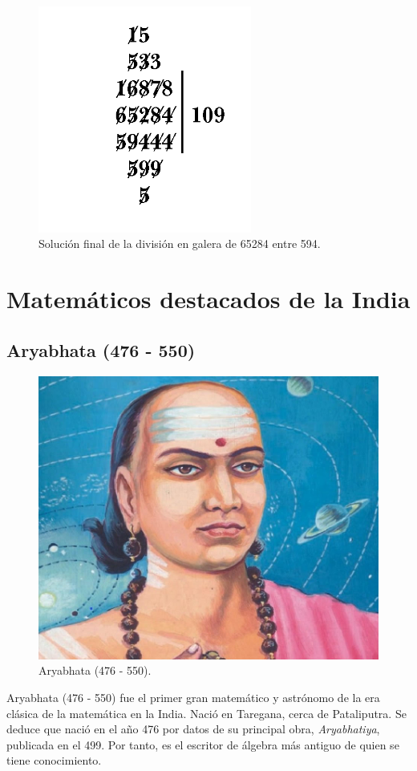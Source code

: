 \documentclass[a4paper, 11pt]{article}
\begin{document}
		\begin{figure}[!ht]
			\centering
			\includegraphics[width = 7cm]{Galley_Method4.png}
			\caption{Solución final de la división en galera de 65284 entre 594.}
			\label{fig:ind_division2}
		\end{figure}

\newpage		
\section{Matemáticos destacados de la India}
	\subsection{Aryabhata (476 - 550)}
		\begin{figure}[!ht]
			\centering
			\includegraphics[width = 10 cm]{aryabhata.jpg}
			\caption{Aryabhata (476 - 550).}
			\label{fig:aryabhata}
		\end{figure}

		Aryabhata (476 - 550) fue el primer gran matemático y astrónomo de la era clásica de la matemática en la India.
		Nació en Taregana, cerca de Pataliputra. Se deduce que nació en el año 476 por datos de su principal obra,
		\textit{Aryabhatiya}, publicada en el 499. Por tanto, es el escritor de álgebra más antiguo de quien se tiene
		conocimiento.
		
\end{document}
